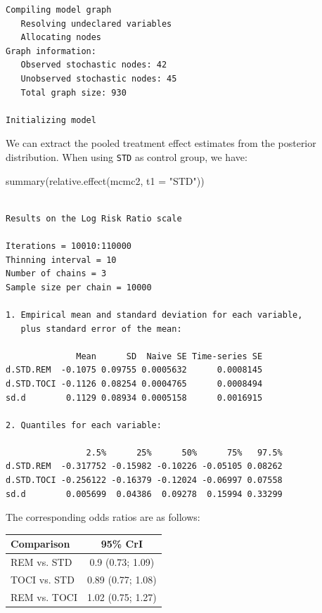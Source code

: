 \documentclass[
  letterpaper,
  DIV=11,
  numbers=noendperiod]{scrreprt}
\newenvironment{Shaded}{\begin{snugshade}}{\end{snugshade}}
\newcommand{\AttributeTok}[1]{\textcolor[rgb]{0.40,0.45,0.13}{#1}}
\newcommand{\FunctionTok}[1]{\textcolor[rgb]{0.28,0.35,0.67}{#1}}
\newcommand{\NormalTok}[1]{\textcolor[rgb]{0.00,0.23,0.31}{#1}}
\newcommand{\StringTok}[1]{\textcolor[rgb]{0.13,0.47,0.30}{#1}}
\begin{document}
\begin{verbatim}
Compiling model graph
   Resolving undeclared variables
   Allocating nodes
Graph information:
   Observed stochastic nodes: 42
   Unobserved stochastic nodes: 45
   Total graph size: 930

Initializing model
\end{verbatim}

We can extract the pooled treatment effect estimates from the posterior
distribution. When using \texttt{STD} as control group, we have:

\begin{Shaded}
\begin{Highlighting}[]
\FunctionTok{summary}\NormalTok{(}\FunctionTok{relative.effect}\NormalTok{(mcmc2, }\AttributeTok{t1 =} \StringTok{"STD"}\NormalTok{))}
\end{Highlighting}
\end{Shaded}

\begin{verbatim}

Results on the Log Risk Ratio scale

Iterations = 10010:110000
Thinning interval = 10 
Number of chains = 3 
Sample size per chain = 10000 

1. Empirical mean and standard deviation for each variable,
   plus standard error of the mean:

              Mean      SD  Naive SE Time-series SE
d.STD.REM  -0.1075 0.09755 0.0005632      0.0008145
d.STD.TOCI -0.1126 0.08254 0.0004765      0.0008494
sd.d        0.1129 0.08934 0.0005158      0.0016915

2. Quantiles for each variable:

                2.5%      25%      50%      75%   97.5%
d.STD.REM  -0.317752 -0.15982 -0.10226 -0.05105 0.08262
d.STD.TOCI -0.256122 -0.16379 -0.12024 -0.06997 0.07558
sd.d        0.005699  0.04386  0.09278  0.15994 0.33299
\end{verbatim}

The corresponding odds ratios are as follows:

\begin{longtable*}{lc}
\toprule
Comparison & 95\% CrI\\
\midrule
REM vs. STD & 0.9 (0.73; 1.09)\\
TOCI vs. STD & 0.89 (0.77; 1.08)\\
REM vs. TOCI & 1.02 (0.75; 1.27)\\
\bottomrule
\end{longtable*}
\end{document}
